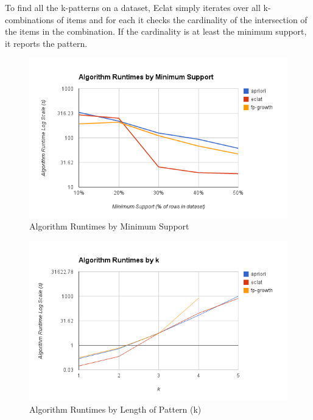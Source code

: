 \documentclass[11pt]{article}
\begin{document}
\begin{multicols}{2}
To find all the k-patterns on a dataset, Eclat simply iterates over
all k-combinations of items and for each it checks the cardinality of
the intersection of the items in the combination.  If the cardinality
is at least the minimum support, it reports the pattern.

\begin{center}
\begin{figure}
\includegraphics[scale=0.9]{../figs/runtimes_by_min_sup.png}
\caption{Algorithm Runtimes by Minimum Support}
\end{figure}
\end{center}

\begin{center}
\begin{figure}
\includegraphics[scale=0.9]{../figs/runtimes_by_k.png}
\caption{Algorithm Runtimes by Length of Pattern (k)}
\end{figure}
\end{center}


\end{multicols}
\end{document}
